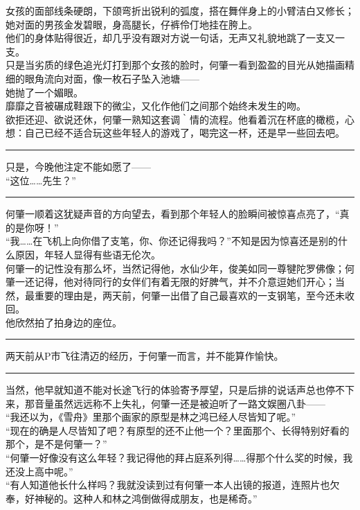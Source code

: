 \documentclass[oneside,11pt]{memoir} %
\begin{document}
\begin{CJK}{UTF8}{gbsn}
    女孩的面部线条硬朗，下颌弯折出锐利的弧度，搭在舞伴身上的小臂洁白又修长；她对面的男孩金发碧眼，身高腿长，仔裤伶仃地挂在胯上。\\\indent 
    他们的身体贴得很近，却几乎没有跟对方说一句话，无声又礼貌地跳了一支又一支。\\\indent 
    只是当劣质的绿色追光灯打到那个女孩的脸时，何肇一看到盈盈的目光从她描画精细的眼角流向对面，像一枚石子坠入池塘——\\\indent 
    她抛了一个媚眼。\\\indent 
    靡靡之音被碾成鞋跟下的微尘，又化作他们之间那个始终未发生的吻。\\\indent 
    欲拒还迎、欲说还休，何肇一熟知这套调｀情的流程。他看着沉在杯底的橄榄，心想：自己已经不适合玩这些年轻人的游戏了，喝完这一杯，还是早一些回去吧。\\\indent 
\rule{-3pt}{30pt}
    只是，今晚他注定不能如愿了——\\\indent 
    “这位……先生？”\\\indent 
\rule{-3pt}{30pt}
    何肇一顺着这犹疑声音的方向望去，看到那个年轻人的脸瞬间被惊喜点亮了，“真的是你呀！”\\\indent 
    “我……在飞机上向你借了支笔，你、你还记得我吗？”不知是因为惊喜还是别的什么原因，年轻人显得有些语无伦次。\\\indent 
     何肇一的记性没有那么坏，当然记得他，水仙少年，俊美如同一尊犍陀罗佛像；何肇一还记得，他对待同行的女伴们有着无限的好脾气，并不介意逗她们开心；当然，最重要的理由是，两天前，何肇一出借了自己最喜欢的一支钢笔，至今还未收回。\\\indent 
    他欣然拍了拍身边的座位。\\\indent 
\rule{-3pt}{30pt}
    两天前从P市飞往清迈的经历，于何肇一而言，并不能算作愉快。\\\indent
\rule{-3pt}{30pt}
    当然，他早就知道不能对长途飞行的体验寄予厚望，只是后排的说话声总也停不下来，那音量虽然远远称不上失礼，何肇一还是被迫听了一路文娱圈八卦——\\\indent
    “我还以为，《雪舟》里那个画家的原型是林之鸿已经人尽皆知了呢。”\\\indent
    “现在的确是人尽皆知了吧？有原型的还不止他一个？里面那个、长得特别好看的那个，是不是何肇一？”\\\indent
    “何肇一好像没有这么年轻？我记得他的拜占庭系列得……得那个什么奖的时候，我还没上高中呢。”\\\indent
    “有人知道他长什么样吗？我就没读到过有何肇一本人出镜的报道，连照片也欠奉，好神秘的。这种人和林之鸿倒做得成朋友，也是稀奇。”\\\indent

\end{CJK}
\end{document}
